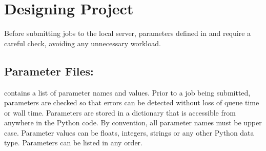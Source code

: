 \documentclass[letterpaper,10pt,english]{sphinxmanual}
\begin{document}
\chapter{Designing Project}
\label{\detokenize{index:designing-project}}
Before submitting jobs to the local server, parameters defined in  and  require a careful check, avoiding any unnecessary workload.


\section{Parameter Files: }
\label{\detokenize{main/design_project:parameter-files-parameters-py}}\label{\detokenize{main/design_project::doc}}
 contains a list of parameter names and values. Prior to a job being submitted, parameters are checked so that errors can be detected without loss of queue time or wall time. Parameters are stored in a dictionary that is accessible from anywhere in the Python code. By convention, all parameter names must be upper case. Parameter values can be floats, integers, strings or any other Python data type. Parameters can be listed in any order.
\end{document}
